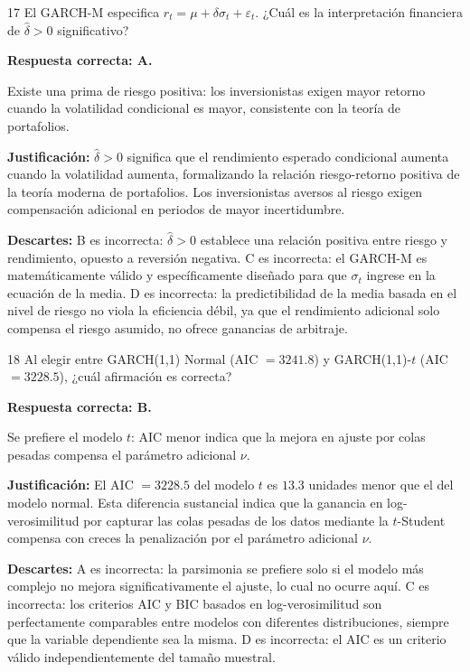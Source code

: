 \documentclass[11pt,a4paper]{article}
\newcommand{\eps}{\varepsilon}
\begin{document}
\begin{cajaCFA}{17}
El GARCH-M especifica $r_t = \mu + \delta\sigma_t + \eps_t$. ¿Cuál es la interpretación financiera de $\hat{\delta}>0$ significativo?
\end{cajaCFA}

\textbf{Respuesta correcta: A.}

Existe una prima de riesgo positiva: los inversionistas exigen mayor retorno cuando la volatilidad condicional es mayor, consistente con la teoría de portafolios.

\textbf{Justificación:} $\hat{\delta}>0$ significa que el rendimiento esperado condicional aumenta cuando la volatilidad aumenta, formalizando la relación riesgo-retorno positiva de la teoría moderna de portafolios. Los inversionistas aversos al riesgo exigen compensación adicional en periodos de mayor incertidumbre.

\textbf{Descartes:} B es incorrecta: $\hat{\delta}>0$ establece una relación positiva entre riesgo y rendimiento, opuesto a reversión negativa. C es incorrecta: el GARCH-M es matemáticamente válido y específicamente diseñado para que $\sigma_t$ ingrese en la ecuación de la media. D es incorrecta: la predictibilidad de la media basada en el nivel de riesgo no viola la eficiencia débil, ya que el rendimiento adicional solo compensa el riesgo asumido, no ofrece ganancias de arbitraje.

\begin{cajaCFA}{18}
Al elegir entre GARCH(1,1) Normal (AIC $=3241.8$) y GARCH(1,1)-$t$ (AIC $=3228.5$), ¿cuál afirmación es correcta?
\end{cajaCFA}

\textbf{Respuesta correcta: B.}

Se prefiere el modelo $t$: AIC menor indica que la mejora en ajuste por colas pesadas compensa el parámetro adicional $\nu$.

\textbf{Justificación:} El AIC $=3228.5$ del modelo $t$ es $13.3$ unidades menor que el del modelo normal. Esta diferencia sustancial indica que la ganancia en log-verosimilitud por capturar las colas pesadas de los datos mediante la $t$-Student compensa con creces la penalización por el parámetro adicional $\nu$.

\textbf{Descartes:} A es incorrecta: la parsimonia se prefiere solo si el modelo más complejo no mejora significativamente el ajuste, lo cual no ocurre aquí. C es incorrecta: los criterios AIC y BIC basados en log-verosimilitud son perfectamente comparables entre modelos con diferentes distribuciones, siempre que la variable dependiente sea la misma. D es incorrecta: el AIC es un criterio válido independientemente del tamaño muestral.
\end{document}
